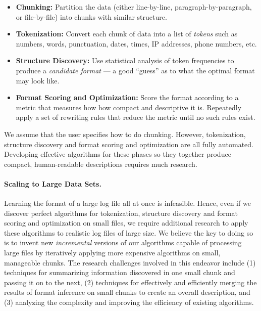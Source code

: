 \begin{itemize}
\item {\bf Chunking:}  Partition the data (either line-by-line,
  paragraph-by-paragraph, or file-by-file) into chunks with similar structure.
\item {\bf Tokenization:}  Convert each chunk of data into a list of 
{\em tokens} such as numbers, words, punctuation, dates, times, IP addresses, phone numbers, etc.
\item {\bf Structure Discovery:}  Use statistical analysis of token
  frequencies to produce a {\em candidate format} --- a good ``guess''
  as to what the optimal format may look like. 
\item {\bf Format Scoring and Optimization:}  Score the format
  according to a metric that measures how how compact and descriptive
  it is.  Repeatedly apply a set of rewriting rules that reduce the
  metric until no such rules exist.
\end{itemize}

We assume that the user specifies how to do chunking.  However,
tokenization, structure discovery and format scoring and optimization are all
fully automated.  Developing effective algorithms for these phases so they together 
produce compact, human-readable descriptions requires much research. 

\paragraph*{Scaling to Large Data Sets.}  Learning the format of a large
log file all at once is infeasible.  Hence, even if we discover perfect
algorithms for tokenization, structure discovery and format scoring and optimization
on small files, we require additional research to apply these algorithms
to realistic log files of large size.  We believe the key to doing so is to invent
new {\em incremental} versions of our algorithms capable of 
processing large files by iteratively applying more expensive
algorithms on small, manageable chunks.  The research challenges
involved in this endeavor include (1) techniques for summarizing
information discovered in one small chunk and passing it on to the
next, (2) techniques for effectively and
efficiently merging the results of format inference on small chunks
to create an overall description, and (3) analyzing the complexity and
improving the efficiency of existing algorithms.

